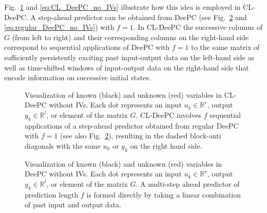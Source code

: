 Fig.~\ref{fig:CL-DeePC} and \eqref{eq:CL_DeePC_no_IVs} illustrate how this idea is employed in \ac{CL-DeePC}. A step-ahead predictor can be obtained from \ac{DeePC} (see Fig.~\ref{fig:regular-DeePC} and \eqref{eq:regular_DeePC_no_IVs}) with $f=1$. In \ac{CL-DeePC} the successive columns of $G$ (from left to right) and their corresponding columns on the right-hand side correspond to sequential applications of \ac{DeePC} with $f=1$ to the same matrix of sufficiently persistently exciting past input-output data on the left-hand side as well as time-shifted windows of input-output data on the right-hand side that encode information on successive initial states.\\ 
%
\begin{figure}[b!]
\centering

\caption{Visualization of known (black) and unknown (red) variables in \ac{CL-DeePC} without \ac{IVs}. Each dot represents an input $u_k\in\mathbb{R}^r$, output $y_k\in\mathbb{R}^l$, or element of the matrix $G$. \ac{CL-DeePC} involves $f$ sequential applications of a step-ahead predictor obtained from regular \ac{DeePC} with $f=1$ (see also Fig.~\ref{fig:regular-DeePC}), resulting in the dashed block-anti diagonals with the same $u_k$ or $y_k$ on the right hand side.}
\label{fig:CL-DeePC}
\end{figure}
\begin{figure}[b!]
\centering

\caption{Visualization of known (black) and unknown (red) variables in \ac{DeePC} without \ac{IVs}. Each dot represents an input $u_k\in\mathbb{R}^r$, output $y_k\in\mathbb{R}^l$, or element of the matrix $G$. A multi-step ahead predictor of prediction length $f$ is formed directly by taking a linear combination of past input and output data.\\\vspace{0.75mm}}
\label{fig:regular-DeePC}
\end{figure}
%
\setcounter{thm}{0}
